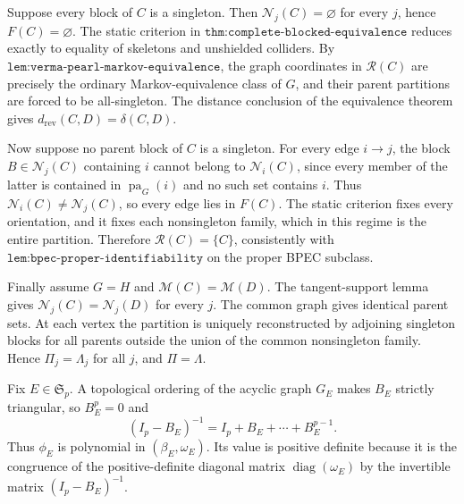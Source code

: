 Suppose every block of \(C\) is a singleton. Then \(\mathcal N_j(C)=\varnothing\) for every \(j\), hence \(F(C)=\varnothing\). The static criterion in \(\texttt{thm:complete-blocked-equivalence}\) reduces exactly to equality of skeletons and unshielded colliders. By \(\texttt{lem:verma-pearl-markov-equivalence}\), the graph coordinates in \(\mathcal R(C)\) are precisely the ordinary Markov-equivalence class of \(G\), and their parent partitions are forced to be all-singleton. The distance conclusion of the equivalence theorem gives \(d_{\mathrm{rev}}(C,D)=\delta(C,D)\).

Now suppose no parent block of \(C\) is a singleton. For every edge \(i\to j\), the block \(B\in\mathcal N_j(C)\) containing \(i\) cannot belong to \(\mathcal N_i(C)\), since every member of the latter is contained in \(\operatorname{pa}_G(i)\) and no such set contains \(i\). Thus \(\mathcal N_i(C)\neq\mathcal N_j(C)\), so every edge lies in \(F(C)\). The static criterion fixes every orientation, and it fixes each nonsingleton family, which in this regime is the entire partition. Therefore \(\mathcal R(C)=\{C\}\), consistently with \(\texttt{lem:bpec-proper-identifiability}\) on the proper BPEC subclass.

Finally assume \(G=H\) and \(\mathcal M(C)=\mathcal M(D)\). The tangent-support lemma gives \(\mathcal N_j(C)=\mathcal N_j(D)\) for every \(j\). The common graph gives identical parent sets. At each vertex the partition is uniquely reconstructed by adjoining singleton blocks for all parents outside the union of the common nonsingleton family. Hence \(\Pi_j=\Lambda_j\) for all \(j\), and \(\Pi=\Lambda\).

Fix \(E\in\mathfrak S_p\). A topological ordering of the acyclic graph \(G_E\) makes \(B_E\) strictly triangular, so \(B_E^p=0\) and
\[
 (I_p-B_E)^{-1}=I_p+B_E+\cdots+B_E^{p-1}.
\]
Thus \(\phi_E\) is polynomial in \((\beta_E,\omega_E)\). Its value is positive definite because it is the congruence of the positive-definite diagonal matrix \(\operatorname{diag}(\omega_E)\) by the invertible matrix \((I_p-B_E)^{-1}\).

